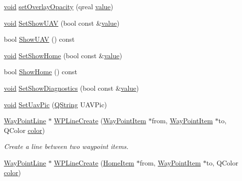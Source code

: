 \begin{DoxyCompactItemize}
\item 
\hyperlink{group___u_a_v_objects_plugin_ga444cf2ff3f0ecbe028adce838d373f5c}{void} \hyperlink{group___o_p_map_widget_ga989b4bdc242ebd97536cffb2be2193fc}{set\-Overlay\-Opacity} (qreal \hyperlink{glext_8h_aa0e2e9cea7f208d28acda0480144beb0}{value})
\item 
\hyperlink{group___u_a_v_objects_plugin_ga444cf2ff3f0ecbe028adce838d373f5c}{void} \hyperlink{group___o_p_map_widget_ga0ced0790f99341bffe4d71cd8f1f3d61}{Set\-Show\-U\-A\-V} (bool const \&\hyperlink{glext_8h_aa0e2e9cea7f208d28acda0480144beb0}{value})
\item 
bool \hyperlink{group___o_p_map_widget_ga07fb8db72de213248c524cae2b148d7a}{Show\-U\-A\-V} () const 
\item 
\hyperlink{group___u_a_v_objects_plugin_ga444cf2ff3f0ecbe028adce838d373f5c}{void} \hyperlink{group___o_p_map_widget_gaa503c30b06667b16caa4190f8fa47f86}{Set\-Show\-Home} (bool const \&\hyperlink{glext_8h_aa0e2e9cea7f208d28acda0480144beb0}{value})
\item 
bool \hyperlink{group___o_p_map_widget_ga0479c8181e84aade1b9a3eac69daf0b6}{Show\-Home} () const 
\item 
\hyperlink{group___u_a_v_objects_plugin_ga444cf2ff3f0ecbe028adce838d373f5c}{void} \hyperlink{group___o_p_map_widget_gabf19ca6f76133841be5fedfff841073e}{Set\-Show\-Diagnostics} (bool const \&\hyperlink{glext_8h_aa0e2e9cea7f208d28acda0480144beb0}{value})
\item 
\hyperlink{group___u_a_v_objects_plugin_ga444cf2ff3f0ecbe028adce838d373f5c}{void} \hyperlink{group___o_p_map_widget_ga6413251a1bea12088cdfa6d7f599ba04}{Set\-Uav\-Pic} (\hyperlink{group___u_a_v_objects_plugin_gab9d252f49c333c94a72f97ce3105a32d}{Q\-String} U\-A\-V\-Pic)
\item 
\hyperlink{classmapcontrol_1_1_way_point_line}{Way\-Point\-Line} $\ast$ \hyperlink{group___o_p_map_widget_gaf6d0234b2aa0e66f40f4da7bc3b9fb4f}{W\-P\-Line\-Create} (\hyperlink{classmapcontrol_1_1_way_point_item}{Way\-Point\-Item} $\ast$from, \hyperlink{classmapcontrol_1_1_way_point_item}{Way\-Point\-Item} $\ast$to, Q\-Color \hyperlink{glext_8h_a3ea846f998d64f079b86052b6c4193a8}{color})
\begin{DoxyCompactList}\small\item\em Create a line between two waypoint items. \end{DoxyCompactList}\item 
\hyperlink{classmapcontrol_1_1_way_point_line}{Way\-Point\-Line} $\ast$ \hyperlink{group___o_p_map_widget_gada64bfaa4e838335d8b923e9e184b373}{W\-P\-Line\-Create} (\hyperlink{classmapcontrol_1_1_home_item}{Home\-Item} $\ast$from, \hyperlink{classmapcontrol_1_1_way_point_item}{Way\-Point\-Item} $\ast$to, Q\-Color \hyperlink{glext_8h_a3ea846f998d64f079b86052b6c4193a8}{color})

\end{DoxyCompactItemize}

